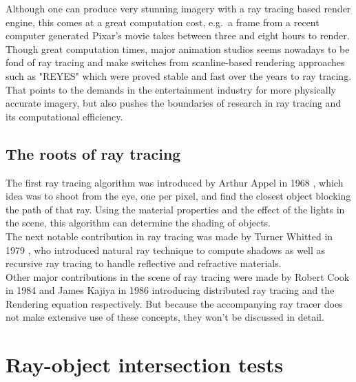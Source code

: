 \documentclass{article}
\begin{document}
Although one can produce very stunning imagery with a ray tracing based render engine, this  comes at a great computation cost, e.g.\ a frame from a recent computer generated Pixar's movie takes between three and eight hours to render. \cite{pixarRentime} \\
Though great computation times, major animation studios seems nowadays to be fond of ray tracing and make switches from scanline-based rendering approaches such as "REYES" which were proved stable and fast over the years to ray tracing. \cite{pixarSwitch} That points to the demands in the entertainment industry for more physically accurate imagery, but also pushes the boundaries of research in ray tracing and its computational efficiency. \cite{disneyHyperion}

\subsection{The roots of ray tracing}
The first ray tracing algorithm was introduced by Arthur Appel in 1968 \cite{appel}, which idea was to shoot from the eye, one per pixel, and find the closest object blocking the path of that ray. Using the material properties and the effect of the lights in the scene, this algorithm can determine the shading of objects. \\
The next notable contribution in ray tracing was made by Turner Whitted in 1979 \cite{whitted}, who introduced natural ray technique to compute shadows as well as recursive ray tracing to handle reflective and refractive materials. \\
Other major contributions in the scene of ray tracing were made by Robert Cook in 1984 \cite{cook} and James Kajiya in 1986 \citep{kajiya} introducing distributed ray tracing and the Rendering equation respectively. But because the accompanying ray tracer does not make extensive use of these concepts, they won't be discussed in detail.




\section{Ray-object intersection tests}
\label{sec:isects}
\end{document}
